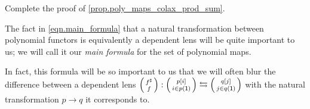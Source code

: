 \documentclass[DynamicalBook]{subfiles}
\begin{document}
\begin{exercise}\label{ex.poly_dependent_lens_functoriality}
Complete the proof of \cref{prop.poly_maps_colax_prod_sum}.
\end{exercise}

\begin{remark}
The fact in \eqref{eqn.main_formula} that a natural transformation between polynomial functors is
equivalently a dependent lens will be quite important to us; we will call it our
\emph{main formula} for the set of polynomial maps.

In fact, this formula will be so important to us that we will often blur the
difference between a dependent lens $\lens{f^{\sharp}}{f} : \lens{p[i]}{i \in
  p(\1)} \fromto \lens{q[j]}{j \in q(\1)}$ with the natural transformation $p \to
q$ it corresponds to.
\end{remark}
\end{document}
